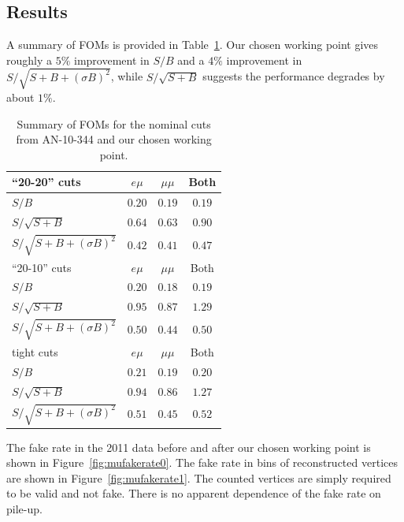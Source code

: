\subsection{Results}
A summary of FOMs is provided in Table~\ref{tab:muidfom1}. Our chosen working point gives roughly a $5\%$ improvement in $S/B$ and a $4\%$ improvement in $S/\sqrt{S+B+(\sigma B)^2}$, while $S/\sqrt{S+B}$ suggests the performance degrades by about $1\%$.

\begin{table}[!htbp]
\begin{center}
\begin{tabular}{|l|c|c|c|}
\hline
	``20-20'' cuts & $e\mu$ & $\mu\mu$ & Both \\
\hline
$S/B$                       & $0.20$ & $0.19$ & $0.19$ \\
$S/\sqrt{S+B}$              & $0.64$ & $0.63$ & $0.90$ \\
$S/\sqrt{S+B+(\sigma B)^2}$ & $0.42$ & $0.41$ & $0.47$ \\
\hline\hline
	``20-10'' cuts & $e\mu$ & $\mu\mu$ & Both \\
\hline
$S/B$                       & $0.20$ & $0.18$ & $0.19$ \\
$S/\sqrt{S+B}$              & $0.95$ & $0.87$ & $1.29$ \\
$S/\sqrt{S+B+(\sigma B)^2}$ & $0.50$ & $0.44$ & $0.50$ \\
\hline\hline
	tight cuts & $e\mu$ & $\mu\mu$ & Both \\
\hline
$S/B$                       & $0.21$ & $0.19$ & $0.20$ \\
$S/\sqrt{S+B}$              & $0.94$ & $0.86$ & $1.27$ \\
$S/\sqrt{S+B+(\sigma B)^2}$ & $0.51$ & $0.45$ & $0.52$ \\
\hline
\end{tabular}
\caption{Summary of FOMs for the nominal cuts from AN-10-344 and our chosen working point.}
\label{tab:muidfom1}
\end{center}
\end{table}

The fake rate in the 2011 data before and after our chosen working point is shown in Figure~\ref{fig:mufakerate0}. The fake rate in bins of reconstructed vertices are shown in Figure~\ref{fig:mufakerate1}. The counted vertices are simply required to be valid and not fake. There is no apparent dependence of the fake rate on pile-up.

